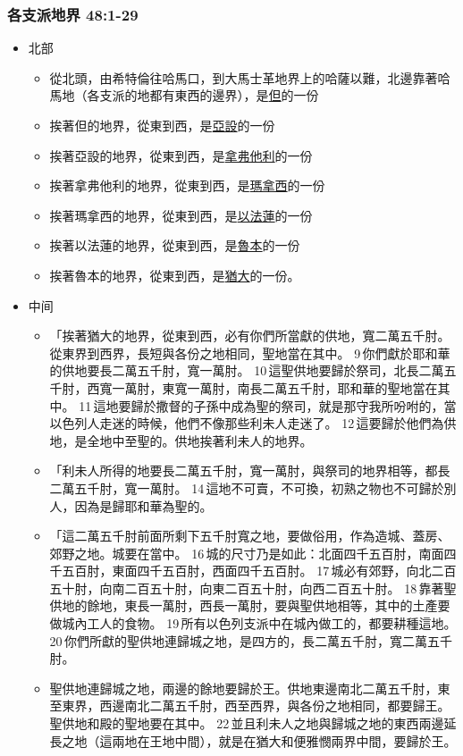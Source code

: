 \subsubsection{各支派地界 48:1-29}
\begin{itemize}
\itemsep-.45em  
\item 北部
\begin{itemize}
\itemsep-.45em  
\item 從北頭，由希特倫往哈馬口，到大馬士革地界上的哈薩以難，北邊靠著哈馬地（各支派的地都有東西的邊界），是\underline{但}的一份
\item 挨著但的地界，從東到西，是\underline{亞設}的一份
\item 挨著亞設的地界，從東到西，是\underline{拿弗他利}的一份
\item 挨著拿弗他利的地界，從東到西，是\underline{瑪拿西}的一份
\item 挨著瑪拿西的地界，從東到西，是\underline{以法蓮}的一份
\item 挨著以法蓮的地界，從東到西，是\underline{魯本}的一份
\item 挨著魯本的地界，從東到西，是\underline{猶大}的一份。
\end{itemize}
\item 中间
\begin{itemize}
\itemsep-.45em  
\item 「挨著猶大的地界，從東到西，必有你們所當獻的供地，寬二萬五千肘。從東界到西界，長短與各份之地相同，聖地當在其中。 9 你們獻於耶和華的供地要長二萬五千肘，寬一萬肘。 10 這聖供地要歸於祭司，北長二萬五千肘，西寬一萬肘，東寬一萬肘，南長二萬五千肘，耶和華的聖地當在其中。 11 這地要歸於撒督的子孫中成為聖的祭司，就是那守我所吩咐的，當以色列人走迷的時候，他們不像那些利未人走迷了。 12 這要歸於他們為供地，是全地中至聖的。供地挨著利未人的地界。
\item 「利未人所得的地要長二萬五千肘，寬一萬肘，與祭司的地界相等，都長二萬五千肘，寬一萬肘。 14 這地不可賣，不可換，初熟之物也不可歸於別人，因為是歸耶和華為聖的。
\item 「這二萬五千肘前面所剩下五千肘寬之地，要做俗用，作為造城、蓋房、郊野之地。城要在當中。 16 城的尺寸乃是如此：北面四千五百肘，南面四千五百肘，東面四千五百肘，西面四千五百肘。 17 城必有郊野，向北二百五十肘，向南二百五十肘，向東二百五十肘，向西二百五十肘。 18 靠著聖供地的餘地，東長一萬肘，西長一萬肘，要與聖供地相等，其中的土產要做城內工人的食物。 19 所有以色列支派中在城內做工的，都要耕種這地。 20 你們所獻的聖供地連歸城之地，是四方的，長二萬五千肘，寬二萬五千肘。
\item 聖供地連歸城之地，兩邊的餘地要歸於王。供地東邊南北二萬五千肘，東至東界，西邊南北二萬五千肘，西至西界，與各份之地相同，都要歸王。聖供地和殿的聖地要在其中。 22 並且利未人之地與歸城之地的東西兩邊延長之地（這兩地在王地中間），就是在猶大和便雅憫兩界中間，要歸於王。

\end{itemize}
\end{itemize}
